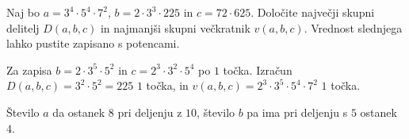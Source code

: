 \documentclass[addpoints]{exam}
\begin{document}
\begin{questions}


    \question[4]
    Naj bo $a=3^4\cdot 5^4\cdot 7^2$, $b=2\cdot 3^3\cdot 225$ in $c=72\cdot 625$. 
    Določite največji skupni delitelj $D(a,b,c)$ in najmanjši skupni večkratnik $v(a,b,c)$. Vrednost slednjega lahko pustite zapisano s potencami.

    \begin{solution}[6cm]
        Za zapisa $b=2\cdot 3^5\cdot 5^2$ in $c=2^3\cdot 3^2\cdot 5^4$ po $1$ točka. 
        Izračun $D(a,b,c)=3^2\cdot 5^2=225$ $1$ točka, in $v(a,b,c)=2^3\cdot 3^5\cdot 5^4\cdot 7^2$ $1$ točka.
    \end{solution}
    
    
    \question
    Število $a$ da ostanek $8$ pri deljenju z $10$, število $b$ pa ima pri deljenju s $5$ ostanek $4$.




     \newpage

    



\end{questions}
\end{document}
